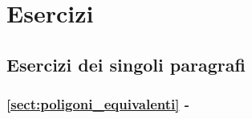 
\section{Esercizi}

\subsection{Esercizi dei singoli paragrafi}

\begingroup
\hypersetup{linkcolor=black}
\subsubsection*{\ref{sect:poligoni_equivalenti} - 
}
\endgroup

